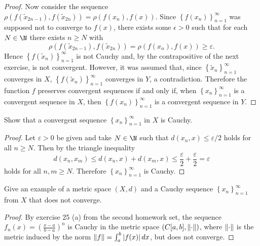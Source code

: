 \documentclass[12pt]{amsart}
\begin{document}
\begin{setup}
\begin{ex}
\begin{proof}
      Now consider the sequence $\rho(f(\tilde{x}_{2n-1}), f(\tilde{x}_{2n})) = \rho(f(x_n), f(x))$.
      Since $\left\{f(x_n)\right\}_{n=1}^\infty$ was supposed not to converge to $f(x)$, there exists some $\epsilon > 0$ such that for each $N \in \N$ there exists $n \geq N$ with 
      $$\rho(f(\tilde{x}_{2n-1}), f(\tilde{x}_{2n})) = \rho(f(x_n), f(x)) \geq \varepsilon.$$
      Hence $\left\{f(\tilde{x}_n)\right\}_{n=1}^\infty$ is not Cauchy and, by the contrapositive of the next exercise, is not convergent.
      However, it was assumed that, since $\left\{\tilde{x}_n\right\}_{n=1}^\infty$ converges in $X$, $\left\{f(\tilde{x}_n)\right\}_{n=1}^\infty$ converges in $Y$, a contradiction.
      Therefore the function $f$ preserves convergent sequences if and only if, when $\left\{x_n\right\}_{n=1}^\infty$ is a convergent sequence in $X$, then $\left\{f(x_n)\right\}_{n=1}^\infty$ is a convergent sequence in $Y$.
    \end{proof}
  \end{ex}

  \begin{ex}
    Show that a convergent sequence $\left\{x_n\right\}_{n=1}^\infty$ in $X$ is Cauchy.
    \begin{proof}
      Let $\varepsilon > 0$ be given and take $N \in \N$ such that $d(x_n, x) \leq \varepsilon/2$ holds for all $n \geq N$.  
      Then by the triangle inequality 
      $$d(x_n, x_m) \leq d(x_n, x) + d(x_m, x) \leq \frac{\varepsilon}{2} + \frac{\varepsilon}{2} = \varepsilon$$
      holds for all $n,m \geq N$.
      Therefore $\left\{x_n\right\}_{n=1}^\infty$ is Cauchy.
    \end{proof}
  \end{ex}

  \begin{ex}
    Give an example of a metric space $(X,d)$ and a Cauchy sequence $\left\{x_n\right\}_{n=1}^\infty$ from $X$ that does not converge.
    \begin{proof}
      By exercise 25 (a) from the second homework set, the sequence $f_n(x) = \left(\frac{x-a}{b-a}\right)^n$ is Cauchy in the metric space $(C[a,b],\lVert\cdot\rVert)$, where $\lVert\cdot\rVert$ is the metric induced by the norm $\lVert f\rVert = \int_a^b \left| f(x) \right|dx$, but does not converge.
    \end{proof}
  \end{ex}


\end{setup}
\end{document}
